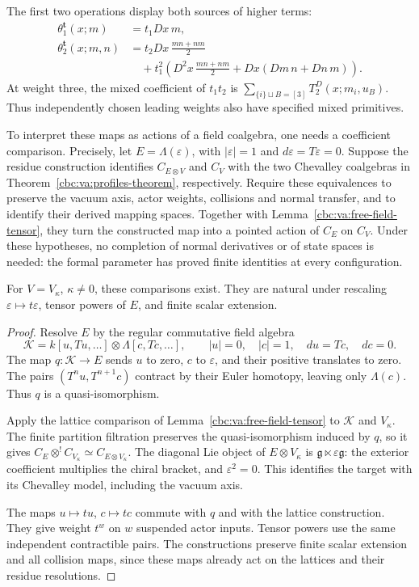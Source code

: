 The first two operations display both sources of
higher terms:
\begin{align*}
 \theta_1^{\mathbf t}(x;m)&=t_1Dx\,m,\\
 \theta_2^{\mathbf t}(x;m,n)
   &=t_2Dx\,\frac{mn+nm}{2}\\
   &\quad+t_1^2\left(
       D^2x\,\frac{mn+nm}{2}+Dx(Dm\,n+Dn\,m)\right).
\end{align*}
At weight three, the mixed coefficient of $t_1t_2$
is $\sum_{\{i\}\sqcup B=[3]}T_2^D(x;m_i,u_B)$.
Thus independently chosen leading weights also have
specified mixed primitives.

To interpret these maps as actions of a field
coalgebra, one needs a coefficient comparison.
Precisely, let $E=\Lambda(\varepsilon)$, with
$|\varepsilon|=1$ and $d\varepsilon=T\varepsilon=0$.
Suppose the residue construction identifies
$C_{E\otimes V}$ and $C_V$ with the two Chevalley
coalgebras in Theorem~\ref{cbc:va:profiles-theorem},
respectively. Require these equivalences to preserve
the vacuum axis, actor weights, collisions and normal
transfer, and to identify their derived mapping
spaces. Together with
Lemma~\ref{cbc:va:free-field-tensor}, they turn the
constructed map into a pointed action of $C_E$ on
$C_V$. Under these hypotheses, no completion of
normal derivatives or of state spaces is needed:
the formal parameter has proved finite identities
at every configuration.

\begin{lemma}\label{cbc:va:heisenberg-admissibility}
For $V=V_\kappa$, $\kappa\ne0$, these comparisons
exist. They are natural under rescaling
$\varepsilon\mapsto t\varepsilon$, tensor powers
of $E$, and finite scalar extension.
\end{lemma}
\begin{proof}
Resolve $E$ by the regular commutative field
algebra
\[
 \mathcal K=k[u,Tu,\ldots]\otimes\Lambda[c,Tc,\ldots],
 \qquad |u|=0,\quad |c|=1,\quad du=Tc,\quad dc=0.
\]
The map $q:\mathcal K\to E$ sends $u$ to zero,
$c$ to $\varepsilon$, and their positive
translates to zero.
The pairs $(T^nu,T^{n+1}c)$ contract by their
Euler homotopy, leaving only $\Lambda(c)$.
Thus $q$ is a quasi-isomorphism.

Apply the lattice comparison of
Lemma~\ref{cbc:va:free-field-tensor} to
$\mathcal K$ and $V_\kappa$.
The finite partition filtration preserves the
quasi-isomorphism induced by $q$, so it gives
$C_E\otimes^!C_{V_\kappa}\simeq C_{E\otimes V_\kappa}$.
The diagonal Lie object of $E\otimes V_\kappa$
is $\mathfrak g\ltimes\varepsilon\mathfrak g$:
the exterior coefficient multiplies the
chiral bracket, and $\varepsilon^2=0$.
This identifies the target with its Chevalley
model, including the vacuum axis.

The maps $u\mapsto tu$, $c\mapsto tc$ commute
with $q$ and with the lattice construction.
They give weight $t^w$ on $w$ suspended actor
inputs. Tensor powers use the same independent
contractible pairs. The constructions preserve
finite scalar extension and all collision maps,
since these maps already act on the lattices
and their residue resolutions.
\end{proof}

